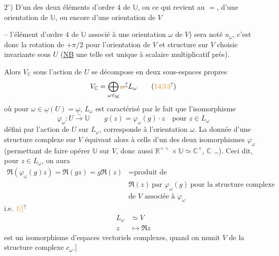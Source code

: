 $2^\circ$) D'un des deux éléments d'ordre $4$ de $\mathbb U$, ou ce qui revient au $=$, d'une orientation de $\mathbb U$, ou encore  d'une orientation de $V$

-- l'élément d'ordre $4$ de $\mathbb U$ associé à une orientation $\omega$ de  $V$) sera noté $u_\omega$, c'est donc la rotation de $+\pi/2$ pour l'orientation \inserted{$\omega$} de $V$ et  structure  sur $V$ choisie invariante sous $U$ (\uline{NB}  une telle  est unique à scalaire multiplicatif près).

Alors $V_{\mathbb C}$ sous l'action de $U$ se décompose en deux sous-espaces propres
\[
 V_{\mathbb C}=\bigoplus_{\omega\in\underline\omega}\deleted{\unsure{\omega}}L_\omega \tag*{(\unsure{14|13})}
\]
où pour $\omega\in\underline\omega(U)=\underline\omega$, $L_\omega$ est caractérisé par le fait que l'isomorphisme
\[
 \varphi_\omega\colon U\xrightarrow{\sim}\mathbb U\qquad g(z)=\varphi_\omega(g)\cdot z\quad\text{pour }z\in L_\omega \tag*{(15)}
\]
défini par l'action de $U$ sur $L_\omega$, corresponde à l'orientation $\omega$. La donnée d'une structure complexe sur $V$  équivaut alors à celle d'un des deux isomorphismes $\varphi_\omega$ (permettant de faire opérer $\mathbb U$ sur $V$, donc aussi $\mathbb R^{\times+}\times\mathbb U\simeq\mathbb C^\times$,  $\mathbb C$ \ldots). Ceci dit, pour  $z\in L_\omega$, on aura
\[
 \begin{aligned}
 \Re (\varphi_\omega(g)z)=\Re (gz)=g\Re (z)&=\text{produit de}\\
 &\Re (z)\ \text{par }\varphi_\omega(g)\ \text{pour la structure complexe}\\[-2pt]
 &\text{de }V\text{ associée à }\varphi_\omega
 \end{aligned}
\]
i.e. \(\unsure{1|\vert}\)
\[
 \begin{aligned} L_\omega&\simeq V\\ z&\longmapsto\Re z\end{aligned}
\]
est un isomorphisme d'espaces vectoriels complexes, quand on munit $V$ de la structure complexe $c_\omega$.\(\big]\)

